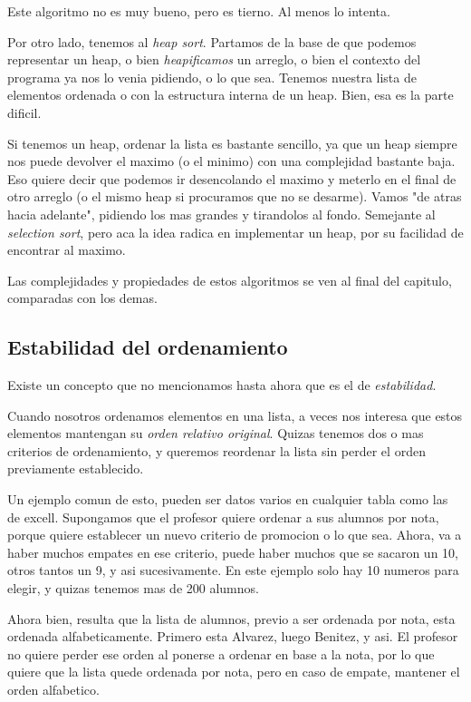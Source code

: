 \documentclass{article}
\begin{document}
Este algoritmo no es muy bueno, pero es tierno. Al menos lo intenta.

Por otro lado, tenemos al \textit{heap sort}. Partamos de la base de que podemos representar un heap, o bien \textit{heapificamos} un arreglo, o bien el contexto del programa ya nos lo venia pidiendo, o lo que sea. Tenemos nuestra lista de elementos ordenada o con la estructura interna de un heap. Bien, esa es la parte dificil.

Si tenemos un heap, ordenar la lista es bastante sencillo, ya que un heap siempre nos puede devolver el maximo (o el minimo) con una complejidad bastante baja. Eso quiere decir que podemos ir desencolando el maximo y meterlo en el final de otro arreglo (o el mismo heap si procuramos que no se desarme). Vamos "de atras hacia adelante", pidiendo los mas grandes y tirandolos al fondo. Semejante al \textit{selection sort}, pero aca la idea radica en implementar un heap, por su facilidad de encontrar al maximo.

Las complejidades y propiedades de estos algoritmos se ven al final del capitulo, comparadas con los demas.

\subsection{Estabilidad del ordenamiento}

Existe un concepto que no mencionamos hasta ahora que es el de \textit{estabilidad}.

Cuando nosotros ordenamos elementos en una lista, a veces nos interesa que estos elementos mantengan su \textit{orden relativo original}. Quizas tenemos dos o mas criterios de ordenamiento, y queremos reordenar la lista sin perder el orden previamente establecido.

Un ejemplo comun de esto, pueden ser datos varios en cualquier tabla como las de excell. Supongamos que el profesor quiere ordenar a sus alumnos por nota, porque quiere establecer un nuevo criterio de promocion o lo que sea. Ahora, va a haber muchos empates en ese criterio, puede haber muchos que se sacaron un 10, otros tantos un 9, y asi sucesivamente. En este ejemplo solo hay 10 numeros para elegir, y quizas tenemos mas de 200 alumnos.

Ahora bien, resulta que la lista de alumnos, previo a ser ordenada por nota, esta ordenada alfabeticamente. Primero esta Alvarez, luego Benitez, y asi. El profesor no quiere perder ese orden al ponerse a ordenar en base a la nota, por lo que quiere que la lista quede ordenada por nota, pero en caso de empate, mantener el orden alfabetico.
\end{document}

